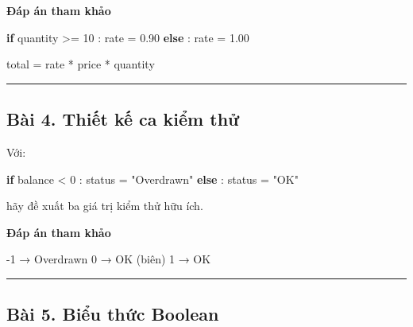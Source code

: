 \documentclass[
  11pt,
  a4paper,
]{article}
\newenvironment{Shaded}{}{}
\newcommand{\ControlFlowTok}[1]{\textcolor[rgb]{0.00,0.44,0.13}{\textbf{#1}}}
\newcommand{\DecValTok}[1]{\textcolor[rgb]{0.25,0.63,0.44}{#1}}
\newcommand{\FloatTok}[1]{\textcolor[rgb]{0.25,0.63,0.44}{#1}}
\newcommand{\NormalTok}[1]{#1}
\newcommand{\OperatorTok}[1]{\textcolor[rgb]{0.40,0.40,0.40}{#1}}
\newcommand{\StringTok}[1]{\textcolor[rgb]{0.25,0.44,0.63}{#1}}
\begin{document}
\textbf{Đáp án tham khảo}

\begin{Shaded}
\begin{Highlighting}[]
\ControlFlowTok{if}\NormalTok{ quantity }\OperatorTok{\textgreater{}=} \DecValTok{10}\NormalTok{ :}
\NormalTok{    rate }\OperatorTok{=} \FloatTok{0.90}
\ControlFlowTok{else}\NormalTok{ :}
\NormalTok{    rate }\OperatorTok{=} \FloatTok{1.00}

\NormalTok{total }\OperatorTok{=}\NormalTok{ rate }\OperatorTok{*}\NormalTok{ price }\OperatorTok{*}\NormalTok{ quantity}
\end{Highlighting}
\end{Shaded}

\begin{center}\rule{0.5\linewidth}{0.5pt}\end{center}

\subsection{Bài 4. Thiết kế ca kiểm
thử}\label{buxe0i-4.-thiux1ebft-kux1ebf-ca-kiux1ec3m-thux1eed}

Với:

\begin{Shaded}
\begin{Highlighting}[]
\ControlFlowTok{if}\NormalTok{ balance }\OperatorTok{\textless{}} \DecValTok{0}\NormalTok{ :}
\NormalTok{    status }\OperatorTok{=} \StringTok{"Overdrawn"}
\ControlFlowTok{else}\NormalTok{ :}
\NormalTok{    status }\OperatorTok{=} \StringTok{"OK"}
\end{Highlighting}
\end{Shaded}

hãy đề xuất ba giá trị kiểm thử hữu ích.

\textbf{Đáp án tham khảo}

\begin{Shaded}
\begin{Highlighting}[]
\NormalTok{{-}1   → Overdrawn}
\NormalTok{0    → OK       (biên)}
\NormalTok{1    → OK}
\end{Highlighting}
\end{Shaded}

\begin{center}\rule{0.5\linewidth}{0.5pt}\end{center}

\subsection{Bài 5. Biểu thức
Boolean}\label{buxe0i-5.-biux1ec3u-thux1ee9c-boolean}
\end{document}
